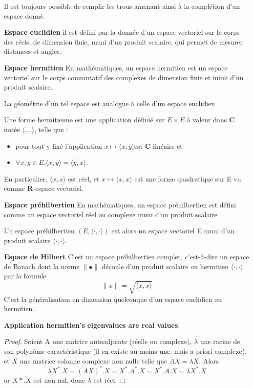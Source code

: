 \documentclass{book}
\begin{document}
Il est toujours possible de remplir les trous amenant ainsi \`a la compl\'etion d'un espace donn\'e.

\textbf{Espace euclidien}
il est d\'efini par la donn\'ee d'un espace vectoriel sur le corps des r\'eels, de dimension finie, muni d'un produit scalaire,
qui permet de mesurer distances et angles.

\textbf{Espace hermitien}
En math\'ematiques, un espace hermitien est un espace vectoriel sur le corps commutatif des complexes de dimension finie et muni d'un produit scalaire.

La g\'eom\'etrie d'un tel espace est analogue \`a celle d'un espace euclidien

Une forme hermitienne est une application d\'efini\'e sur $E \times E$ \`a valeur dans $\mathbf{C}$ not\'ee $\langle .,.\rangle$, telle que :
\begin{itemize}
		\item pour tout y fix\'e l'application $x \mapsto \langle x,y\rangle $est $\mathbf{C}$-lin\'eaire et
		\item $\forall x,y \in E$,$\langle x,y\rangle=\overline{ \langle y,x\rangle}$.
\end{itemize}
En particulier, $\langle x,x\rangle$ est r\'eel, et $x\mapsto \langle x,x\rangle$ est une forme quadratique sur E vu comme $\mathbf{R}$-espace vectoriel.

\textbf{Espace pr\'ehilbertien}
En math\'ematiques, un espace pr\'ehilbertien est d\'efini comme un espace vectoriel r\'eel ou complexe muni d'un produit scalaire

Un espace pr\'ehilbertien $(E,\langle\cdot,\cdot\rangle)$ est alors un espace vectoriel E muni d'un produit scalaire $\langle\cdot,\cdot\rangle$.

\textbf{Espace de Hilbert}
C'est un espace pr\'ehilbertien complet, c'est-\`a-dire un espace de Banach dont
la norme $\parallel\bullet\parallel$ d\'ecoule d'un produit scalaire ou hermitien $\langle\cdot,\cdot\rangle$ par la formule
$$\parallel x\parallel = \sqrt{\langle x,x \rangle}$$
C'est la g\'en\'eralisation en dimension quelconque d'un espace euclidien ou hermitien.
\bigskip

\textbf{Application hermitien's eigenvalues are real values}.
\begin{proof}
Soient A une matrice autoadjointe (r\'eelle ou complexe), $\lambda$ une racine de son polyn\^ome caract\'eristique (il en existe au moins une,
mais a priori complexe), et $X$ une matrice colonne complexe non nulle telle que
$AX=\lambda X$. Alors
$$ \overline\lambda X^*.X=(AX)^*.X=X^*.A^*.X=X^*.A.X=\lambda X^*.X $$
or $X*.X$ est non nul, donc $\lambda$ est r\'eel.
\end{proof}
\end{document}
